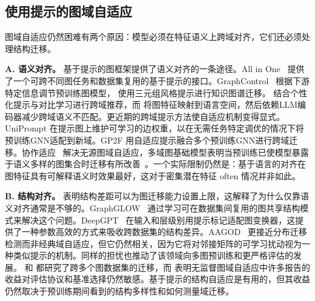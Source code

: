 \subsection{使用提示的图域自适应}\label{sec:pdomain}
图域自适应仍然困难有两个原因：模型必须在特征语义上跨域对齐，它们还必须处理结构迁移。


\textbf{A. 语义对齐。}
基于提示的图框架提供了语义对齐的一条途径。All in One~\cite{sun2023all} 提供了一个可跨不同图任务和数据集复用的基于提示的接口。GraphControl~\cite{zhu2023graphcontrol} 根据下游特定信息调节预训练图模型，\citet{zhang2023structure} 使用三元组风格提示进行知识图谱迁移。\citet{yi2023contrastive} 结合个性化提示与对比学习进行跨域推荐，而 \citet{liu2023one} 将图特征映射到语言空间，然后依赖LLM编码器减少跨域语义不匹配。更近期的跨域提示方法使自适应机制变得显式。UniPrompt \cite{huang2025oneprompt} 在提示图上维护可学习的边权重，以在无需任务特定调优的情况下将预训练GNN适配到新域。GP2F \cite{he2026gp2f} 用自适应提示融合多个预训练GNN进行跨域迁移。协作适应~\cite{zhang2024collaborate} 解决无源图域自适应，多域图基础模型表明当预训练已使模型暴露于语义多样的图集合时迁移有所改善~\cite{wang2025multidomain,yu2025samgpt}。一个实际限制仍然是：基于语言的对齐在图特征具有可解释语义时效果最好，这对于密集潜在特征 often 情况并非如此。


\textbf{B. 结构对齐。}
\citet{cao2023when} 表明结构差距可以为图迁移能力设置上限，这解释了为什么仅靠语义对齐通常是不够的。GraphGLOW~\cite{zhao2023graphglow} 通过学习可在数据集间复用的图共享结构模式来解决这个问题。DeepGPT~\cite{shirkavand2023deep} 在输入和层级别用提示标记适配图变换器，这提供了一种参数高效的方式来吸收跨数据集的结构差异。AAGOD~\cite{guo2023datacentric} 更接近分布迁移检测而非经典域自适应，但它仍然相关，因为它将对邻接矩阵的可学习扰动视为一种类似提示的机制。同样的担忧也推动了该领域向多图预训练和更严格评估的发展。\citet{zhao2024all} 和 \citet{wang2025multidomain} 都研究了跨多个图数据集的迁移，而 \citet{liu2024revisiting} 表明无监督图域自适应中许多报告的收益对评估协议和基准选择仍然敏感。基于提示的结构自适应是有用的，但其收益仍然取决于预训练期间看到的结构多样性和如何测量域迁移。
